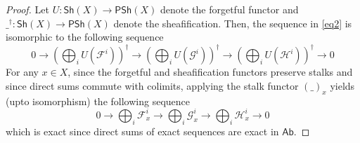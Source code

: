 \documentclass[oneside,11pt]{amsart}
\theoremstyle{definition}
\theoremstyle{remark}
\begin{document}
\begin{proof}
	Let $U:\textsf{Sh}(X) \rightarrow \textsf{PSh}(X) $ denote the forgetful functor and ${\_}^{\dag}: \textsf{Sh}(X)  \rightarrow  \textsf{PSh}(X)$ denote the sheafification. Then, the sequence in \cref{eq2} is isomorphic to the following sequence
	\begin{equation*}
	 0 \rightarrow (\bigoplus_{i} U(\mathscr{F}^{i}))^{\dag} \rightarrow (\bigoplus_{i} U(\mathscr{G}^{i}))^{\dag} \rightarrow (\bigoplus_{i} U(\mathscr{H}^{i}))^{\dag} \rightarrow 0
	\end{equation*}
	For any $x\in X$, since the forgetful and sheafification functors preserve stalks and since direct sums commute with colimits, applying the stalk functor $(\_)_{x}$ yields (upto isomorphism) the following sequence
\begin{equation*}
 0 \longrightarrow  \bigoplus_{i}\mathscr{F}^{i}_{x} \longrightarrow \bigoplus_{i}\mathscr{G}^{i}_{x} \longrightarrow \bigoplus_{i}\mathscr{H}^{i}_{x} \longrightarrow 0 
\end{equation*}
which is exact since direct sums of exact sequences are exact in $\textsf{Ab} $. 
\end{proof}
\end{document}
